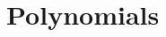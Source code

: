 \documentclass[xcolor=svgnames,9pt,english,aspectratio=169,t]{beamer}
\begin{document}



%






%
%
%

\section{Polynomials}
\end{document}
